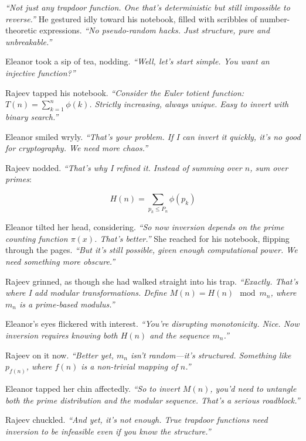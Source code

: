 \bigskip

\textit{“Not just any trapdoor function. One that’s deterministic but still impossible to reverse.”} He gestured idly toward his notebook, filled with scribbles of number-theoretic expressions. \textit{“No pseudo-random hacks. Just structure, pure and unbreakable.”}

\bigskip
\noindent
Eleanor took a sip of tea, nodding. \textit{“Well, let’s start simple. You want an injective function?”}
\bigskip

\noindent
Rajeev tapped his notebook. \textit{“Consider the Euler totient function: \( T(n) = \sum_{k=1}^{n} \phi(k) \). Strictly increasing, always unique. Easy to invert with binary search.”}
\bigskip

\noindent
Eleanor smiled wryly. \textit{“That’s your problem. If I can invert it quickly, it’s no good for cryptography. We need more chaos.”}

\bigskip

\noindent
Rajeev nodded. \textit{“That’s why I refined it. Instead of summing over \( n \), sum over primes}:

\[ H(n) = \sum_{p_k \leq P_n} \phi(p_k) \]

Eleanor tilted her head, considering. \textit{“So now inversion depends on the prime counting function \( \pi(x) \). That’s better.”} She reached for his notebook, flipping through the pages. \textit{“But it’s still possible, given enough computational power. We need something more obscure.”}

\bigskip

Rajeev grinned, as though she had walked straight into his trap. \textit{“Exactly. That’s where I add modular transformations. Define \( M(n) = H(n) \mod m_n \), where \( m_n \) is a prime-based modulus.”}

Eleanor’s eyes flickered with interest. \textit{“You’re disrupting monotonicity. Nice. Now inversion requires knowing both \( H(n) \) and the sequence \( m_n \).”}
\bigskip

Rajeev on it now. \textit{“Better yet, \( m_n \) isn’t random—it’s structured. Something like \( p_{f(n)} \), where \( f(n) \) is a non-trivial mapping of \( n \).”}

Eleanor tapped her chin affectedly. \textit{“So to invert \( M(n) \), you’d need to untangle both the prime distribution and the modular sequence. That’s a serious roadblock.”}

\bigskip

Rajeev chuckled. \textit{“And yet, it’s not enough. True trapdoor functions need inversion to be infeasible even if you know the structure.”}

